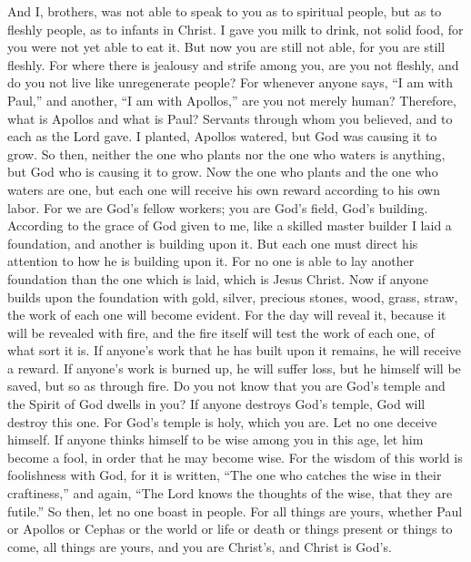 \begin{biblechapter} %
 And I, brothers, was not able to speak to you as to spiritual people, but as to fleshly people, as to infants in Christ.
\verse I gave you milk to drink, not solid food, for you were not yet able to eat it. But now you are still not able,
\verse for you are still fleshly. For where there is jealousy and strife among you, are you not fleshly, and do you not live like unregenerate people?
\verse For whenever anyone says, “I am with Paul,” and another, “I am with Apollos,” are you not merely human?
\verse Therefore, what is Apollos and what is Paul? Servants through whom you believed, and to each as the Lord gave.
\verse I planted, Apollos watered, but God was causing it to grow.
\verse So then, neither the one who plants nor the one who waters is anything, but God who is causing it to grow.
\verse Now the one who plants and the one who waters are one, but each one will receive his own reward according to his own labor.
\verse For we are God’s fellow workers; you are God’s field, God’s building.
\verse According to the grace of God given to me, like a skilled master builder I laid a foundation, and another is building upon it. But each one must direct his attention to how he is building upon it.
\verse For no one is able to lay another foundation than the one which is laid, which is Jesus Christ.
\verse Now if anyone builds upon the foundation with gold, silver, precious stones, wood, grass, straw,
\verse the work of each one will become evident. For the day will reveal it, because it will be revealed with fire, and the fire itself will test the work of each one, of what sort it is.
\verse If anyone’s work that he has built upon it remains, he will receive a reward.
\verse If anyone’s work is burned up, he will suffer loss, but he himself will be saved, but so as through fire.
\verse Do you not know that you are God’s temple and the Spirit of God dwells in you?
\verse If anyone destroys God’s temple, God will destroy this one. For God’s temple is holy, which you are.
\verse Let no one deceive himself. If anyone thinks himself to be wise among you in this age, let him become a fool, in order that he may become wise.
\verse For the wisdom of this world is foolishness with God, for it is written, “The one who catches the wise in their craftiness,”
\verse and again, “The Lord knows the thoughts of the wise, that they are futile.”
\verse So then, let no one boast in people. For all things are yours,
\verse whether Paul or Apollos or Cephas or the world or life or death or things present or things to come, all things are yours,
\verse and you are Christ’s, and Christ is God’s.
\end{biblechapter}

